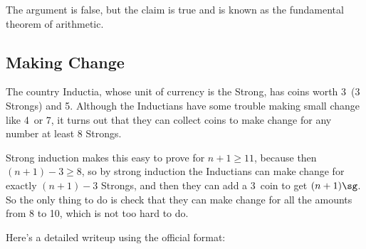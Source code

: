 The argument is false, but the claim is true and is known as the
fundamental theorem of arithmetic.
\fi

\subsection{Making Change}

The country Inductia, whose unit of currency is the Strong, has coins
worth 3\sg\ (3 Strongs) and 5\sg.  Although the Inductians have some
trouble making small change like 4\sg\ or 7\sg, it turns out that they can
collect coins to make change for any number at least 8 Strongs.

Strong induction makes this easy to prove for $n+1 \ge 11$, because then
$(n+1)-3 \ge 8$, so by strong induction the Inductians can make change for
exactly $(n+1)-3$ Strongs, and then they can add a 3\sg\ coin to get
$(n+1)\sg$.  So the only thing to do is check that they can make change
for all the amounts from 8 to 10\sg, which is not too hard to do.

Here's a detailed writeup using the official format:

